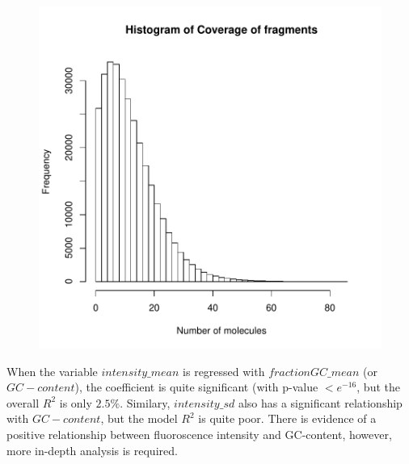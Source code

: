 \documentclass[11pt]{article}
\begin{document}
\begin{figure}[th]
\centering 
\includegraphics{GCvsIntensity_Report1-003}
\end{figure}

When the variable $intensity\_mean$ is regressed with $fractionGC\_mean$ (or $GC-content$), the coefficient is quite significant (with p-value $<e^{-16}$, but the overall $R^2$ is only $2.5\%$. Similary, $intensity\_sd$ also has a significant relationship with $GC-content$, but the model $R^2$ is quite poor. There is evidence of a positive relationship between fluoroscence intensity and GC-content, however, more in-depth analysis is required. 
\end{document}
